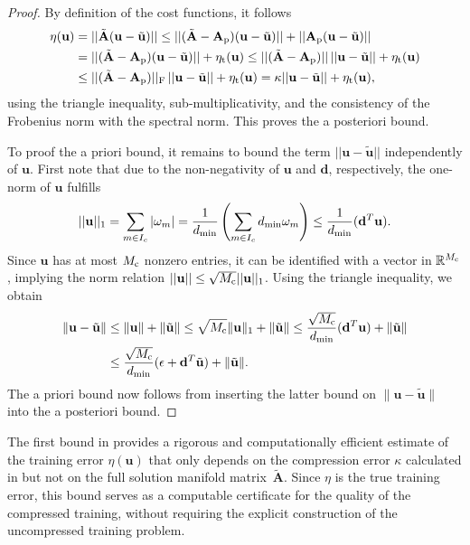\documentclass[onefignum,onetabnum]{siamart251104}
\newcommand{\bv}[1]{{\mathbf #1}}
\newcommand{\bt}[1]{{\mathbf{#1}}}
\newcommand{\com}[1]{{{#1}_{\rm{c}}}} %
\newcommand{\prol}[1]{{{#1}_{\rm{p}}}} %
\newcommand{\thi}[1]{{{#1}_{\rm{t}}}}	%
\newcommand{\R}{\mathbb{R}}
\newcommand{\wei}{{\omega}} %
\newcommand{\vwei}{\bv{u}} %
\newcommand{\Ap}{{\bt{A}}}
\newcommand{\fopt}{{\eta}}
\newcommand{\dreg}{{{\bv{d}}}}
\begin{document}
\begin{proof}
By definition of the cost functions, it follows
{\small
\begin{align*}
\fopt(\vwei) &=|| \tilde{\Ap} (\vwei - \tilde{\vwei}) || \leq || (\tilde{\Ap} - \prol{\Ap}) (\vwei - \tilde{\vwei}) || + || \prol{\Ap} (\vwei - \tilde{\vwei}) ||  \\
&=  || (\tilde{\Ap} - \prol{\Ap}) (\vwei - \tilde{\vwei}) || + \thi{\fopt}(\vwei) \leq || (\tilde{\Ap} - \prol{\Ap})|| \, ||\vwei - \tilde{\vwei}||  + \thi{\fopt}(\vwei) \\
&\leq  || (\tilde{\Ap} - \prol{\Ap})||_{\rm{F}} \, ||\vwei - \tilde{\vwei}||  + \thi{\fopt}(\vwei)  = \kappa ||\vwei - \tilde{\vwei}|| + \thi{\fopt}(\vwei),
\end{align*}
}%
using the triangle inequality, sub-multiplicativity, and the consistency of the Frobenius norm with the spectral norm. This proves the a posteriori bound.

To proof the a priori bound, it remains to bound the term $||\vwei - \tilde{\vwei}||$ independently of $\vwei$. First note that
due to the non-negativity of $\vwei$ and $\dreg$, respectively, the one-norm of $\vwei$ fulfills
\begin{align*}
||\vwei||_1 = \sum_{m\in I_c} |\wei_m|  =  \frac{1}{d_{\rm{min}}} \left(\sum_{m\in I_c} d_{\rm{min}} \wei_m \right)  \leq  \frac{1}{d_{\rm{min}}}(\dreg^T \vwei ).
\end{align*}
Since $\vwei$ has at most $\com{M}$ nonzero entries, it can be identified with a vector in $\R^{\com{M}}$, implying the norm relation $||\vwei|| \leq \sqrt{\com{M}} ||\vwei||_1$. Using the triangle inequality, we obtain
\begin{align*}
\| \vwei - \tilde{\vwei} \| &\leq  \| \vwei \| + \|\tilde{\vwei}\|
\leq \sqrt{\com{M}}  \| \vwei \|_1  + \|\tilde{\vwei}\| 
 \leq      \frac{\sqrt{\com{M}}}{d_{\rm{min}}}(\dreg^T \vwei ) + \|\tilde{\vwei}\| 
\\ &\leq \frac{\sqrt{\com{M}}}{d_{\rm{min}}} ( \epsilon+ \dreg^T \tilde{\vwei})  + \|\tilde{\vwei}\| .
\end{align*}
The a priori bound now follows from inserting the latter bound on $\| \vwei - \tilde{\vwei} \|$ into the a posteriori bound.
\end{proof}
The first bound in  provides a rigorous and computationally efficient estimate of the training error $\fopt(\vwei)$ that only depends on the compression error  $\kappa$ calculated in  but not on the full solution manifold matrix~$\tilde{\Ap}$. Since $\fopt$ is the true training error, this bound serves as a computable certificate for the quality of the compressed training, without requiring the explicit construction of the uncompressed training problem.
\end{document}
